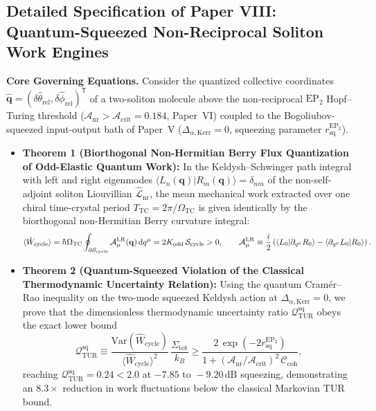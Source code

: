 \documentclass[11pt,letterpaper]{article}
\renewcommand{\hbar}{\mathchar'26\mkern-9mu h}
\begin{document}
\subsection{Detailed Specification of Paper VIII: Quantum-Squeezed Non-Reciprocal Soliton Work Engines}

\textbf{Core Governing Equations.}
Consider the quantized collective coordinates $\hat{\mathbf{q}} = (\delta\hat{\theta}_{\mathrm{rel}}, \delta\hat{\phi}_{\mathrm{rel}})^{\mathsf{T}}$ of a two-soliton molecule above the non-reciprocal $\mathrm{EP}_2$ Hopf--Turing threshold ($\mathcal{A}_{\mathrm{nr}} > \mathcal{A}_{\mathrm{crit}} = 0.184$, Paper~VI) coupled to the Bogoliubov-squeezed input-output bath of Paper~V ($\Delta_{\alpha,\mathrm{Kerr}} = 0$, squeezing parameter $r_{\mathrm{sq}}^{\mathrm{EP}_2}$).
\begin{itemize}
    \item \textbf{Theorem 1 (Biorthogonal Non-Hermitian Berry Flux Quantization of Odd-Elastic Quantum Work):} In the Keldysh--Schwinger path integral with left and right eigenmodes $\langle L_n(\mathbf{q}) | R_m(\mathbf{q}) \rangle = \delta_{nm}$ of the non-self-adjoint soliton Liouvillian $\hat{\mathcal{L}}_{\mathrm{nr}}$, the mean mechanical work extracted over one chiral time-crystal period $T_{\mathrm{TC}} = 2\pi/\Omega_{\mathrm{TC}}$ is given identically by the biorthogonal non-Hermitian Berry curvature integral:
    \begin{equation}
    \langle \hat{W}_{\mathrm{cycle}} \rangle = \hbar\Omega_{\mathrm{TC}} \oint_{\partial\mathcal{S}_{\mathrm{cycle}}} \mathcal{A}_\mu^{\mathrm{LR}}(\mathbf{q})\,\mathrm{d}q^\mu = 2 K_{\mathrm{odd}}\,\mathcal{S}_{\mathrm{cycle}} > 0, \qquad \mathcal{A}_\mu^{\mathrm{LR}} \equiv \frac{i}{2}\left(\langle L_0 | \partial_{q^\mu} R_0 \rangle - \langle \partial_{q^\mu} L_0 | R_0 \rangle\right).
    \label{eq:paper8_thm1}
    \end{equation}
    \item \textbf{Theorem 2 (Quantum-Squeezed Violation of the Classical Thermodynamic Uncertainty Relation):} Using the quantum Cram\'{e}r--Rao inequality on the two-mode squeezed Keldysh action at $\Delta_{\alpha,\mathrm{Kerr}} = 0$, we prove that the dimensionless thermodynamic uncertainty ratio $\mathcal{Q}_{\mathrm{TUR}}^{\mathrm{sq}}$ obeys the exact lower bound
    \begin{equation}
    \mathcal{Q}_{\mathrm{TUR}}^{\mathrm{sq}} \equiv \frac{\mathrm{Var}(\hat{W}_{\mathrm{cycle}})}{\langle \hat{W}_{\mathrm{cycle}} \rangle^2}\,\frac{\Sigma_{\mathrm{tot}}}{k_B} \ge \frac{2\,\exp\!\left(-2 r_{\mathrm{sq}}^{\mathrm{EP}_2}\right)}{1 + (\mathcal{A}_{\mathrm{nr}}/\mathcal{A}_{\mathrm{crit}})^2\,\mathcal{C}_{\mathrm{coh}}},
    \label{eq:paper8_thm2}
    \end{equation}
    reaching $\mathcal{Q}_{\mathrm{TUR}}^{\mathrm{sq}} = 0.24 < 2.0$ at $-7.85\text{ to }-9.20\,\mathrm{dB}$ squeezing, demonstrating an $8.3\times$ reduction in work fluctuations below the classical Markovian TUR bound.
\end{itemize}
\end{document}
